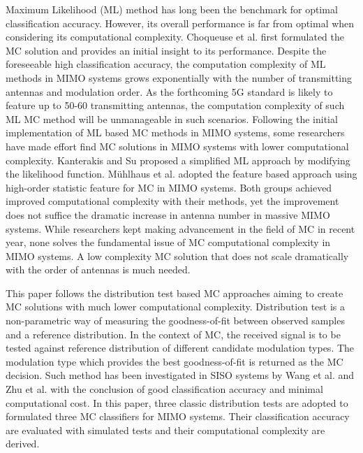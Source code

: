 \documentclass[conference]{IEEEtran}
\begin{document}
Maximum Likelihood (ML) method has long been the benchmark for optimal classification accuracy. However, its overall performance is far from optimal when considering its computational complexity. Choqueuse et al. first formulated the MC solution and provides an initial insight to its performance\cite{Choqueuse2009}. Despite the foreseeable high classification accuracy, the computation complexity of ML methods in MIMO systems grows exponentially with the number of transmitting antennas and modulation order. As the forthcoming 5G standard is likely to feature up to 50-60 transmitting antennas, the computation complexity of such ML MC method will be unmanageable in such scenarios. Following the initial implementation of ML based MC methods in MIMO systems, some researchers have made effort find MC solutions in MIMO systems with lower computational complexity. Kanterakis and Su proposed a simplified ML approach by modifying the likelihood function\cite{Kanterakis}. Mühlhaus et al. adopted the feature based approach using high-order statistic feature for MC in MIMO systems\cite{Muhlhaus}. Both groups achieved improved computational complexity with their methods, yet the improvement does not suffice the dramatic increase in antenna number in massive MIMO systems. While researchers kept making advancement in the field of MC in recent year\cite{Abu-Romoh,Zhang,Ali,Wu}, none solves the fundamental issue of MC computational complexity in MIMO systems. A low complexity MC solution that does not scale dramatically with the order of antennas is much needed.

This paper follows the distribution test based MC approaches aiming to create MC solutions with much lower computational complexity. Distribution test is a non-parametric way of measuring the goodness-of-fit between observed samples and a reference distribution. In the context of MC, the received signal is to be tested against reference distribution of different candidate modulation types. The modulation type which provides the best goodness-of-fit is returned as the MC decision. Such method has been investigated in SISO systems by Wang et al. \cite{Wang} and Zhu et al. \cite{Zhu} with the conclusion of good classification accuracy and minimal computational cost. In this paper, three classic distribution tests are adopted to formulated three MC classifiers for MIMO systems. Their classification accuracy are evaluated with simulated tests and their computational complexity are derived.
\end{document}
